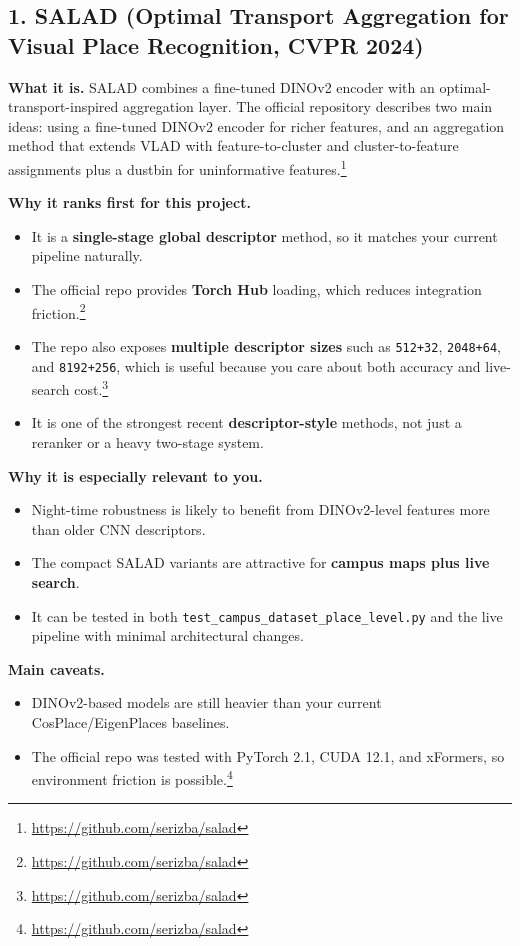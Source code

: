 \documentclass[11pt]{article}
\begin{document}
\subsection*{1. SALAD (Optimal Transport Aggregation for Visual Place Recognition, CVPR 2024)}
\textbf{What it is.} SALAD combines a fine-tuned DINOv2 encoder with an optimal-transport-inspired aggregation layer. The official repository describes two main ideas: using a fine-tuned DINOv2 encoder for richer features, and an aggregation method that extends VLAD with feature-to-cluster and cluster-to-feature assignments plus a dustbin for uninformative features.\footnote{\url{https://github.com/serizba/salad}}

\textbf{Why it ranks first for this project.}
\begin{itemize}[leftmargin=*]
  \item It is a \textbf{single-stage global descriptor} method, so it matches your current pipeline naturally.
  \item The official repo provides \textbf{Torch Hub} loading, which reduces integration friction.\footnote{\url{https://github.com/serizba/salad}}
  \item The repo also exposes \textbf{multiple descriptor sizes} such as \texttt{512+32}, \texttt{2048+64}, and \texttt{8192+256}, which is useful because you care about both accuracy and live-search cost.\footnote{\url{https://github.com/serizba/salad}}
  \item It is one of the strongest recent \textbf{descriptor-style} methods, not just a reranker or a heavy two-stage system.
\end{itemize}

\textbf{Why it is especially relevant to you.}
\begin{itemize}[leftmargin=*]
  \item Night-time robustness is likely to benefit from DINOv2-level features more than older CNN descriptors.
  \item The compact SALAD variants are attractive for \textbf{campus maps plus live search}.
  \item It can be tested in both \texttt{test\_campus\_dataset\_place\_level.py} and the live pipeline with minimal architectural changes.
\end{itemize}

\textbf{Main caveats.}
\begin{itemize}[leftmargin=*]
  \item DINOv2-based models are still heavier than your current CosPlace/EigenPlaces baselines.
  \item The official repo was tested with PyTorch 2.1, CUDA 12.1, and xFormers, so environment friction is possible.\footnote{\url{https://github.com/serizba/salad}}
\end{itemize}
\end{document}
